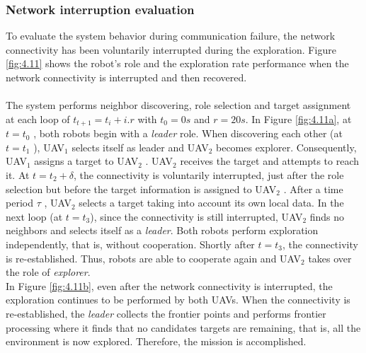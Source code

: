 \documentclass[11pt,openany]{book}
\begin{document}
\subsubsection{Network interruption evaluation}
To evaluate the system behavior during communication failure, the network connectivity has been voluntarily interrupted during the exploration. Figure \ref{fig:4.11} shows the robot’s role and the exploration rate performance when the network connectivity is interrupted and then recovered.\\\\
The system performs neighbor discovering, role selection and target assignment at each loop of $t_{t+1}=t_i+i.r$ with $t_0=0s$ and $r=20s$. In Figure \ref{fig:4.11a}, at $t=t_0$ , both robots begin with a \textit{leader} role. When discovering each other (at $t=t_1$ ), UAV$_1$ selects itself as leader and UAV$_2$ becomes explorer. Consequently, UAV$_1$ assigns a target to UAV$_2$ . UAV$_2$ receives the target and attempts to reach it. At $t=t_2+\delta $, the connectivity is voluntarily interrupted, just after the role selection but before the target information is assigned to UAV$_2$ . After a time period $\tau $ , UAV$_2$ selects a target taking into account its own local data. In the next loop (at $t=t_3$), since the connectivity is still interrupted, UAV$_2$ ﬁnds no neighbors and selects itself as a \textit{leader}. Both robots perform exploration independently, that is, without cooperation. Shortly after $t=t_3$, the connectivity is re-established. Thus, robots are able to cooperate again and UAV$_2$ takes over the role of \textit{explorer}.\\
In Figure \ref{fig:4.11b}, even after the network connectivity is interrupted, the exploration continues to be performed by both UAVs. When the connectivity is re-established, the \textit{leader} collects the frontier points and performs frontier processing where it ﬁnds that no candidates targets are remaining, that is, all the environment is now explored. Therefore, the mission is accomplished.
\end{document}
